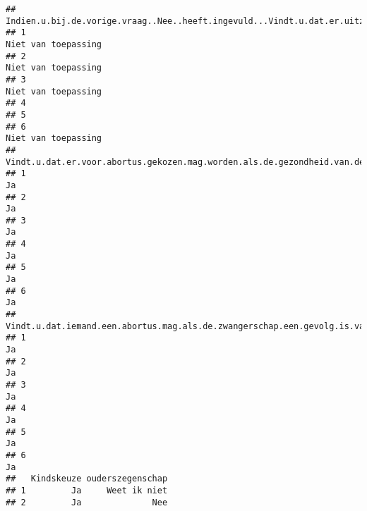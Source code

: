 \documentclass[
]{article}
\begin{document}
\begin{verbatim}
##   Indien.u.bij.de.vorige.vraag..Nee..heeft.ingevuld...Vindt.u.dat.er.uitzonderingen.zijn.waarin.iemand.dit.wel.zelf.moet.kunnen.kiezen.....
## 1                                                                                                                      Niet van toepassing 
## 2                                                                                                                      Niet van toepassing 
## 3                                                                                                                      Niet van toepassing 
## 4                                                                                                                                          
## 5                                                                                                                                          
## 6                                                                                                                      Niet van toepassing 
##   Vindt.u.dat.er.voor.abortus.gekozen.mag.worden.als.de.gezondheid.van.de.vrouw.door.de.zwangerschap.in.gevaar.kan.komen.
## 1                                                                                                                      Ja
## 2                                                                                                                      Ja
## 3                                                                                                                      Ja
## 4                                                                                                                      Ja
## 5                                                                                                                      Ja
## 6                                                                                                                      Ja
##   Vindt.u.dat.iemand.een.abortus.mag.als.de.zwangerschap.een.gevolg.is.van.verkrachting.
## 1                                                                                     Ja
## 2                                                                                     Ja
## 3                                                                                     Ja
## 4                                                                                     Ja
## 5                                                                                     Ja
## 6                                                                                     Ja
##   Kindskeuze ouderszegenschap
## 1         Ja     Weet ik niet
## 2         Ja              Nee

\end{verbatim}
\end{document}
